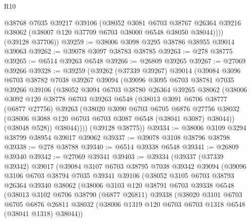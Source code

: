 \begin{lexlean}{R10}
\begin{coremodule}
          @38768
          @7035
          @39217
          @39106
          (@38052
            @3081
            @6703
            @38767
            @26364
            @39216
            @38062
            (@38007 @120 @37709 @6703 @38000 @6548 @38050 @38044))))
      (@39128 @37706))
@39259 := @38006 @3098 @3295 @38786 @38955 @39014 @39063
@39262 := @39078 @3097 @38783 @38785
@39263 := @278 @38775
@39265 := @6514 @39263 @6548
@39266 := @26809 @39265
@39267 := @27069 @39266
@39328 := @39259
    (@39262
      (@37339 @39267)
      @39014
      (@39084
        @3096
        @6703
        @38782
        @7038
        @39267
        @39094
        (@39096
          @3095
          @6703
          @38781
          @7035
          @39266
          @39106
          (@38052
            @3094
            @6703
            @38780
            @26364
            @39265
            @38062
            (@38006
              @3092
              @120
              @38778
              @6703
              @39263
              @6548
              (@38013
                @3091
                @6706
                @38777
                (@6877 @27756)
                @39263
                (@38020
                  @3090
                  @6703
                  @6705
                  @6876
                  @27756
                  @38032
                  (@38006 @3088 @120 @6703 @6703 @3087 @6548 (@38041 @3087) @38044))
                (@38048 @528))
              @38044))))
      (@39128 @38775))
@39334 := @38006 @3109 @3294 @38799 @38954 @39017 @39062
@39337 := @39078 @3108 @38796 @38798
@39338 := @278 @38788
@39340 := @6514 @39338 @6548
@39341 := @26809 @39340
@39342 := @27069 @39341
@39403 := @39334
    (@39337
      (@37339 @39342)
      @39017
      (@39084
        @3107
        @6703
        @38795
        @7038
        @39342
        @39094
        (@39096
          @3106
          @6703
          @38794
          @7035
          @39341
          @39106
          (@38052
            @3105
            @6703
            @38793
            @26364
            @39340
            @38062
            (@38006
              @3103
              @120
              @38791
              @6703
              @39338
              @6548
              (@38013
                @3102
                @6706
                @38790
                (@6877 @26811)
                @39338
                (@38020
                  @3101
                  @6703
                  @6705
                  @6876
                  @26811
                  @38032
                  (@38006 @1319 @120 @6703 @6703 @1318 @6548 (@38041 @1318) @38044))

\end{coremodule}
\end{lexlean}
